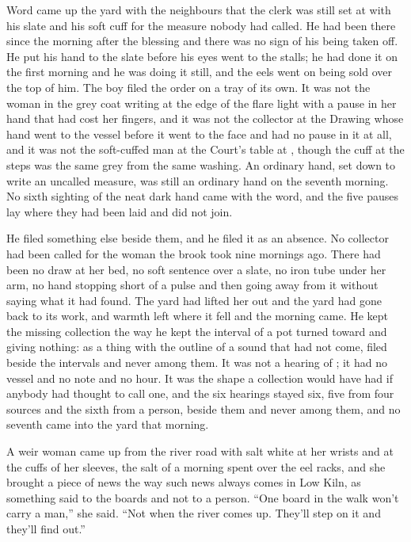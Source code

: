 Word came up the yard with the neighbours that the clerk was still set at  with his slate and his soft cuff for the measure nobody had called. He had been there since the morning after the blessing and there was no sign of his being taken off. He put his hand to the slate before his eyes went to the stalls; he had done it on the first morning and he was doing it still, and the eels went on being sold over the top of him. The boy filed the order on a tray of its own. It was not the woman in the grey coat writing at the edge of the flare light with a pause in her hand that had cost her fingers, and it was not the collector at the Drawing whose hand went to the vessel before it went to the face and had no pause in it at all, and it was not the soft-cuffed man at the Court's table at , though the cuff at the steps was the same grey from the same washing. An ordinary hand, set down to write an uncalled measure, was still an ordinary hand on the seventh morning. No sixth sighting of the neat dark hand came with the word, and the five pauses lay where they had been laid and did not join.

He filed something else beside them, and he filed it as an absence. No collector had been called for the woman the brook took nine mornings ago. There had been no draw at her bed, no soft sentence over a slate, no iron tube under her arm, no hand stopping short of a pulse and then going away from it without saying what it had found. The yard had lifted her out and the yard had gone back to its work, and warmth left where it fell and the morning came. He kept the missing collection the way he kept the interval of a pot turned toward and giving nothing: as a thing with the outline of a sound that had not come, filed beside the intervals and never among them. It was not a hearing of ; it had no vessel and no note and no hour. It was the shape a collection would have had if anybody had thought to call one, and the six hearings stayed six, five from four sources and the sixth from a person, beside them and never among them, and no seventh came into the yard that morning.

\scenebreak

A weir woman came up from the river road with salt white at her wrists and at the cuffs of her sleeves, the salt of a morning spent over the eel racks, and she brought a piece of news the way such news always comes in Low Kiln, as something said to the boards and not to a person. “One board in the walk won't carry a man,” she said. “Not when the river comes up. They'll step on it and they'll find out.”


